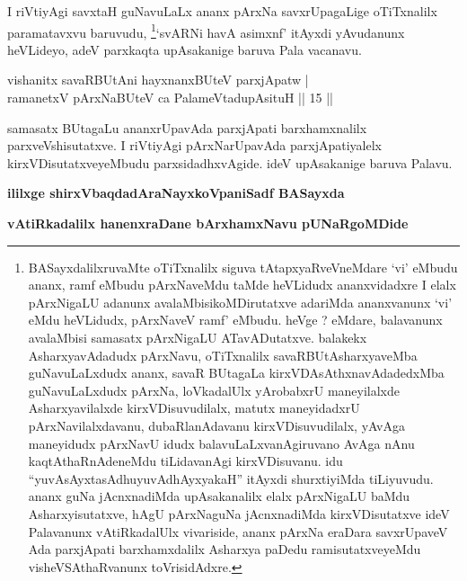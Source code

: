 \begin{artha}
I riVtiyAgi savxtaH guNavuLaLx ananx pArxNa savxrUpagaLige oTiTxnalilx paramatavxvu baruvudu, \footnote{BASayxdalilxruvaMte oTiTxnalilx siguva tAtapxyaRveVneMdare \mdash  `vi' eMbudu ananx, ramf eMbudu pArxNaveMdu taMde heVLidudx ananxvidadxre I elalx pArxNigaLU adanunx avalaMbisikoMDirutatxve adariMda ananxvanunx `vi' eMdu heVLidudx, pArxNaveV ramf' eMbudu. heVge ? eMdare, balavanunx avalaMbisi samasatx pArxNigaLU ATavADutatxve. balakekx AsharxyavAdadudx pArxNavu, oTiTxnalilx savaRBUtAsharxyaveMba guNavuLaLxdudx ananx, savaR BUtagaLa kirxVDAsAthxnavAdadedxMba guNavuLaLxdudx pArxNa, loVkadalUlx yArobabxrU maneyilalxde Asharxyavilalxde kirxVDisuvudilalx, matutx maneyidadxrU pArxNavilalxdavanu, dubaRlanAdavanu kirxVDisuvudilalx, yAvAga maneyidudx pArxNavU idudx balavuLaLxvanAgiruvano AvAga nAnu kaqtAthaRnAdeneMdu tiLidavanAgi kirxVDisuvanu. idu ``yuvAsAyxtasAdhuyuvAdhAyxyakaH'' itAyxdi shurxtiyiMda tiLiyuvudu. ananx guNa jAcnxnadiMda upAsakanalilx elalx pArxNigaLU baMdu Asharxyisutatxve, hAgU pArxNaguNa jAcnxnadiMda kirxVDisutatxve ideV Palavanunx vAtiRkadalUlx vivariside, ananx pArxNa eraDara savxrUpaveV Ada parxjApati barxhamxdalilx Asharxya paDedu ramisutatxveyeMdu visheVSAthaRvanunx toVrisidAdxre.}`svARNi havA asimxnf' itAyxdi yAvudanunx heVLideyo, adeV parxkaqta upAsakanige baruva Pala vacanavu.
\end{artha}


\begin{shl}
vishanitx savaRBUtAni hayxnanxBUteV parxjApatw  | \\
ramanetxV pArxNaBUteV ca PalameVtadupAsituH \hfill ||  15 || 
\end{shl}

\begin{artha}
samasatx BUtagaLu ananxrUpavAda parxjApati barxhamxnalilx parxveVshisutatxve. I riVtiyAgi pArxNarUpavAda parxjApatiyalelx kirxVDisutatxveyeMbudu parxsidadhxvAgide. ideV upAsakanige baruva Palavu.
\end{artha}

\begin{center}
{\bf ililxge shirxVbaqdadAraNayxkoVpaniSadf BASayxda}
\smallskip

{\bf vAtiRkadalilx hanenxraDane bArxhamxNavu pUNaRgoMDide}
\end{center}
